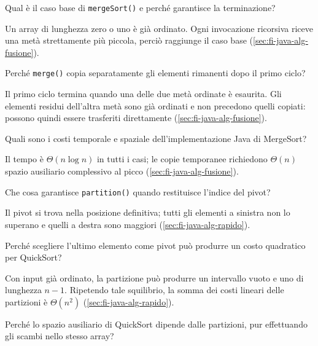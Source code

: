 \begin{exercise}
\label{ex:fi-esercizi-java-alg-merge-caso-base}
Qual è il caso base di \texttt{mergeSort()} e perché garantisce
la terminazione?
\end{exercise}

Un array di lunghezza zero o uno è già ordinato. Ogni invocazione
ricorsiva riceve una metà strettamente più piccola, perciò
raggiunge il caso base (\cref{sec:fi-java-alg-fusione}).

\begin{exercise}
\label{ex:fi-esercizi-java-alg-merge-residui}
Perché \texttt{merge()} copia separatamente gli elementi
rimanenti dopo il primo ciclo?
\end{exercise}

Il primo ciclo termina quando una delle due metà ordinate è
esaurita. Gli elementi residui dell'altra metà sono già ordinati
e non precedono quelli copiati: possono quindi essere trasferiti
direttamente (\cref{sec:fi-java-alg-fusione}).

\begin{exercise}
\label{ex:fi-esercizi-java-alg-merge-costi}
Quali sono i costi temporale e spaziale dell'implementazione
Java di MergeSort?
\end{exercise}

Il tempo è \(\Theta(n\log n)\) in tutti i casi; le copie
temporanee richiedono \(\Theta(n)\) spazio ausiliario
complessivo al picco (\cref{sec:fi-java-alg-fusione}).

\begin{exercise}
\label{ex:fi-esercizi-java-alg-quick-partizione}
Che cosa garantisce \texttt{partition()} quando restituisce
l'indice del pivot?
\end{exercise}

Il pivot si trova nella posizione definitiva; tutti gli elementi
a sinistra non lo superano e quelli a destra sono maggiori
(\cref{sec:fi-java-alg-rapido}).

\begin{exercise}
\label{ex:fi-esercizi-java-alg-quick-peggiore}
Perché scegliere l'ultimo elemento come pivot può produrre
un costo quadratico per QuickSort?
\end{exercise}

Con input già ordinato, la partizione può produrre un intervallo
vuoto e uno di lunghezza \(n-1\). Ripetendo tale squilibrio,
la somma dei costi lineari delle partizioni è \(\Theta(n^2)\)
(\cref{sec:fi-java-alg-rapido}).

\begin{exercise}
\label{ex:fi-esercizi-java-alg-quick-spazio}
Perché lo spazio ausiliario di QuickSort dipende dalle
partizioni, pur effettuando gli scambi nello stesso array?
\end{exercise}


